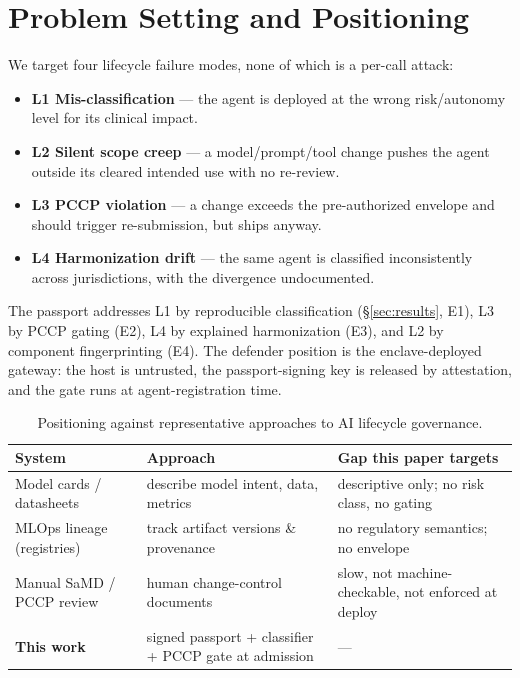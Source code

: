 \documentclass[11pt]{article}
\begin{document}
\section{Problem Setting and Positioning}
We target four lifecycle failure modes, none of which is a per-call attack:
\begin{itemize}
  \item \textbf{L1 Mis-classification} --- the agent is deployed at the wrong
  risk/autonomy level for its clinical impact.
  \item \textbf{L2 Silent scope creep} --- a model/prompt/tool change pushes the agent
  outside its cleared intended use with no re-review.
  \item \textbf{L3 PCCP violation} --- a change exceeds the pre-authorized envelope and
  should trigger re-submission, but ships anyway.
  \item \textbf{L4 Harmonization drift} --- the same agent is classified inconsistently
  across jurisdictions, with the divergence undocumented.
\end{itemize}
The passport addresses L1 by reproducible classification (\S\ref{sec:results}, E1), L3
by PCCP gating (E2), L4 by explained harmonization (E3), and L2 by component
fingerprinting (E4). The defender position is the enclave-deployed gateway: the host is
untrusted, the passport-signing key is released by attestation, and the gate runs at
agent-registration time.

\begin{table}[htb]\centering\small
\begin{tabular}{L{3.2cm}L{4.2cm}L{4.2cm}}
\toprule
System & Approach & Gap this paper targets \\
\midrule
Model cards / datasheets & describe model intent, data, metrics & descriptive only;
no risk class, no gating \\
MLOps lineage (registries) & track artifact versions \& provenance & no
regulatory semantics; no envelope \\
Manual SaMD / PCCP review~\cite{schwoebel2026haarf} & human change-control documents & slow,
not machine-checkable, not enforced at deploy \\
\textbf{This work} & signed passport + classifier + PCCP gate at admission & --- \\
\bottomrule
\end{tabular}
\caption{Positioning against representative approaches to AI lifecycle governance.}
\label{tab:related}
\end{table}
\end{document}
